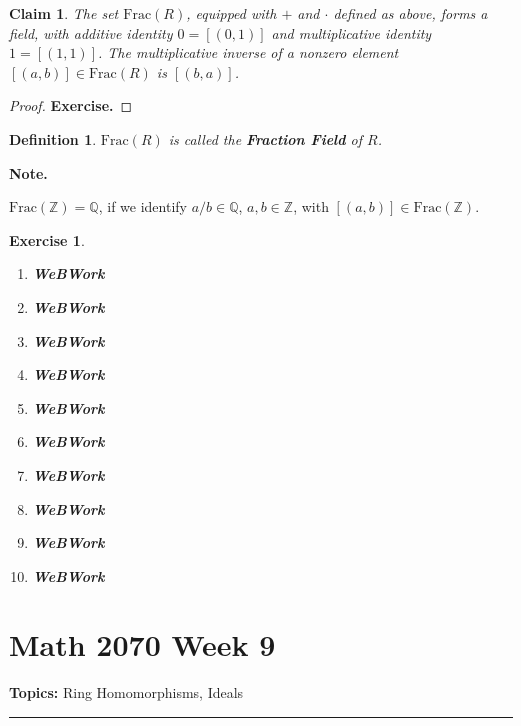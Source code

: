 \documentclass[a4paper,12pt]{report}
\newcounter{statement}
\numberwithin{statement}{chapter}
\newtheorem{defn}[statement]{Definition}
\newtheorem{claim}[statement]{Claim}
\newtheorem{ex}[statement]{\bf Exercise}
\numberwithin{equation}{chapter}
\numberwithin{section}{chapter}
\numberwithin{subsection}{section}
\begin{document}
\begin{claim}

The set $\mathrm{Frac}(R)$, equipped with $+$ and $\cdot$ defined as above,
forms a field, with additive identity $0 = [(0, 1)]$
and multiplicative identity $1 = [(1, 1)]$.
The multiplicative inverse of a nonzero element
$[(a, b)] \in \mathrm{Frac}(R)$ is $[(b, a)]$.

\end{claim}
\begin{proof}

 {\bf Exercise.} 

\end{proof}




\begin{defn}
$\mathrm{Frac}(R)$ is called the  {\bf Fraction Field}  of $R$.
\end{defn}



 {\bf Note.} 

$\mathrm{Frac}(\mathbb{Z}) = \mathbb{Q}$,
if we identify $a/b \in \mathbb{Q}$, $a, b \in \mathbb{Z}$,
with $[(a, b)] \in \mathrm{Frac}(\mathbb{Z})$.


\begin{ex}
\begin{enumerate}
\item  
{\bf WeBWork}

\item  
{\bf WeBWork}

\item  
{\bf WeBWork}

\item  
{\bf WeBWork}

\item  
{\bf WeBWork}

\item  
{\bf WeBWork}

\item  
{\bf WeBWork}

\item  
{\bf WeBWork}

\item  
{\bf WeBWork}

\item  
{\bf WeBWork}
\end{enumerate}
\end{ex}
\setcounter{chapter}{9}\setcounter{section}{0}
\setcounter{subsection}{0}
\setcounter{statement}{0}

\chapter*{Math 2070 Week 9}
{\bf Topics: }Ring Homomorphisms, Ideals
\hrule
\end{document}
